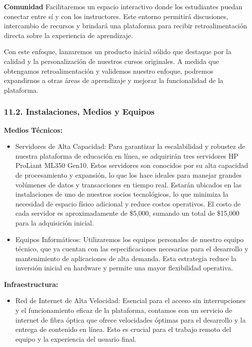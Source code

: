 \documentclass[
]{article}
\providecommand{\tightlist}{%
  \setlength{\itemsep}{0pt}\setlength{\parskip}{0pt}}
\begin{document}
\textbf{Comunidad} Facilitaremos un espacio interactivo donde los
estudiantes puedan conectar entre sí y con los instructores. Este
entorno permitirá discusiones, intercambio de recursos y brindará una
plataforma para recibir retroalimentación directa sobre la experiencia
de aprendizaje.

Con este enfoque, lanzaremos un producto inicial sólido que destaque por
la calidad y la personalización de nuestros cursos originales. A medida
que obtengamos retroalimentación y validemos nuestro enfoque, podremos
expandirnos a otras áreas de aprendizaje y mejorar la funcionalidad de
la plataforma.

\subsubsection{11.2. Instalaciones, Medios y
Equipos}\label{instalaciones-medios-y-equipos}

\textbf{Medios Técnicos:}

\begin{itemize}
\item
  Servidores de Alta Capacidad: Para garantizar la escalabilidad y
  robustez de nuestra plataforma de educación en línea, se adquirirán
  tres servidores HP ProLiant ML350 Gen10. Estos servidores son
  conocidos por su alta capacidad de procesamiento y expansión, lo que
  los hace ideales para manejar grandes volúmenes de datos y
  transacciones en tiempo real. Estarán ubicados en las instalaciones de
  uno de nuestros socios tecnológicos, lo que minimiza la necesidad de
  espacio físico adicional y reduce costos operativos. El costo de cada
  servidor es aproximadamente de \$5,000, sumando un total de \$15,000
  para la adquisición inicial.
\item
  Equipos Informáticos: Utilizaremos los equipos personales de nuestro
  equipo técnico, que ya cuentan con las especificaciones necesarias
  para el desarrollo y mantenimiento de aplicaciones de alta demanda.
  Esta estrategia reduce la inversión inicial en hardware y permite una
  mayor flexibilidad operativa.
\end{itemize}

\textbf{Infraestructura:}

\begin{itemize}
\tightlist
\item
  Red de Internet de Alta Velocidad: Esencial para el acceso sin
  interrupciones y el funcionamiento eficaz de la plataforma, contamos
  con un servicio de internet de fibra óptica que ofrece velocidades
  óptimas para el desarrollo y la entrega de contenido en línea. Esto es
  crucial para el trabajo remoto del equipo y la experiencia del usuario
  final.
\end{itemize}
\end{document}
